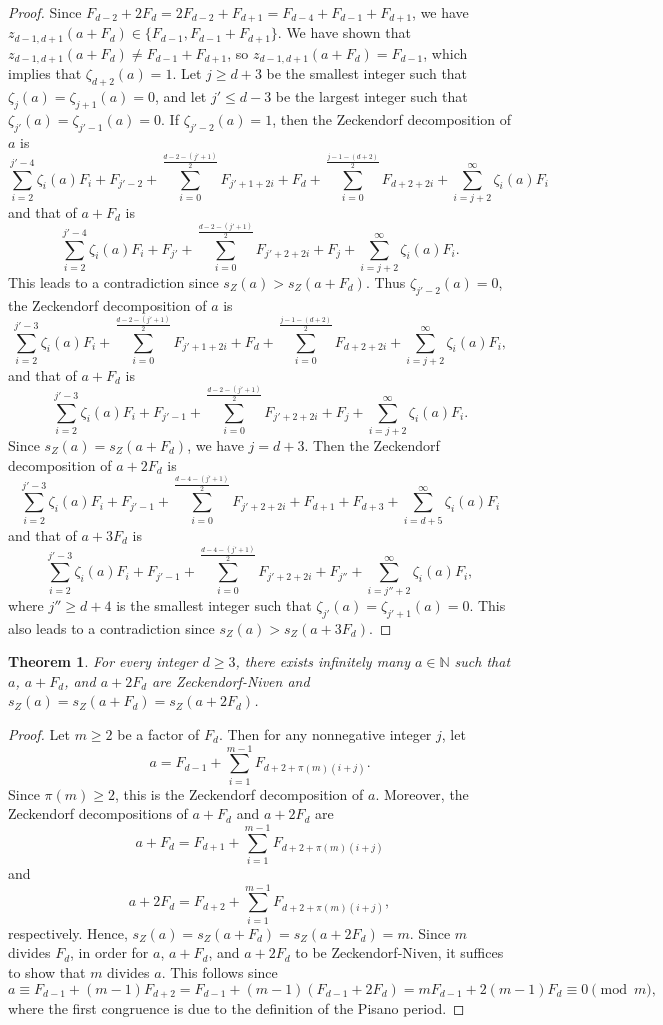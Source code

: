 \documentclass[12pt]{article}
\newtheorem{theorem}{Theorem}[section]
\theoremstyle{definition}
\newcommand{\N}{\mathbb{N}}
\begin{document}
\begin{proof}
Since $F_{d-2}+2F_d=2F_{d-2}+F_{d+1}=F_{d-4}+F_{d-1}+F_{d+1}$, we have $z_{d-1,d+1}(a+F_d)\in\{F_{d-1},F_{d-1}+F_{d+1}\}$. We have shown that $z_{d-1,d+1}(a+F_d)\neq F_{d-1}+F_{d+1}$, so $z_{d-1,d+1}(a+F_d)=F_{d-1}$, which implies that $\zeta_{d+2}(a)=1$. Let $j\geq d+3$ be the smallest integer such that $\zeta_j(a)=\zeta_{j+1}(a)=0$, and let $j'\leq d-3$ be the largest integer such that $\zeta_{j'}(a)=\zeta_{j'-1}(a)=0$. If $\zeta_{j'-2}(a)=1$, then the Zeckendorf decomposition of $a$ is
\[\sum_{i=2}^{j'-4}\zeta_i(a)F_i+F_{j'-2}+\sum_{i=0}^{\frac{d-2-(j'+1)}{2}}F_{j'+1+2i}+F_d+\sum_{i=0}^{\frac{j-1-(d+2)}{2}}F_{d+2+2i}+\sum_{i=j+2}^\infty\zeta_i(a)F_i\]
and that of $a+F_d$ is
\[\sum_{i=2}^{j'-4}\zeta_i(a)F_i+F_{j'}+\sum_{i=0}^{\frac{d-2-(j'+1)}{2}}F_{j'+2+2i}+F_j+\sum_{i=j+2}^\infty\zeta_i(a)F_i.\]
This leads to a contradiction since $s_Z(a)>s_Z(a+F_d)$. Thus $\zeta_{j'-2}(a)=0$, the Zeckendorf decomposition of $a$ is
\[\sum_{i=2}^{j'-3}\zeta_i(a)F_i+\sum_{i=0}^{\frac{d-2-(j'+1)}{2}}F_{j'+1+2i}+F_d+\sum_{i=0}^{\frac{j-1-(d+2)}{2}}F_{d+2+2i}+\sum_{i=j+2}^\infty\zeta_i(a)F_i,\]
and that of $a+F_d$ is
\[\sum_{i=2}^{j'-3}\zeta_i(a)F_i+F_{j'-1}+\sum_{i=0}^{\frac{d-2-(j'+1)}{2}}F_{j'+2+2i}+F_j+\sum_{i=j+2}^\infty\zeta_i(a)F_i.\]
Since $s_Z(a)=s_Z(a+F_d)$, we have $j=d+3$. Then the Zeckendorf decomposition of $a+2F_d$ is
\[\sum_{i=2}^{j'-3}\zeta_i(a)F_i+F_{j'-1}+\sum_{i=0}^{\frac{d-4-(j'+1)}{2}}F_{j'+2+2i}+F_{d+1}+F_{d+3}+\sum_{i=d+5}^\infty\zeta_i(a)F_i\]
and that of $a+3F_d$ is
\[\sum_{i=2}^{j'-3}\zeta_i(a)F_i+F_{j'-1}+\sum_{i=0}^{\frac{d-4-(j'+1)}{2}}F_{j'+2+2i}+F_{j''}+\sum_{i=j''+2}^\infty\zeta_i(a)F_i,\]
where $j''\geq d+4$ is the smallest integer such that $\zeta_{j'}(a)=\zeta_{j'+1}(a)=0$. This also leads to a contradiction since $s_Z(a)>s_Z(a+3F_d)$.
\end{proof}

\begin{theorem}
For every integer $d\geq3$, there exists infinitely many $a\in\N$ such that $a$, $a+F_d$, and $a+2F_d$ are Zeckendorf-Niven and $s_Z(a)=s_Z(a+F_d)=s_Z(a+2F_d)$.
\end{theorem}
\begin{proof}
Let $m\geq2$ be a factor of $F_d$. Then for any nonnegative integer $j$, let
\[a=F_{d-1}+\sum_{i=1}^{m-1}F_{d+2+\pi(m)(i+j)}.\]
Since $\pi(m)\geq2$, this is the Zeckendorf decomposition of $a$. Moreover, the Zeckendorf decompositions of $a+F_d$ and $a+2F_d$ are
\[a+F_d=F_{d+1}+\sum_{i=1}^{m-1}F_{d+2+\pi(m)(i+j)}\]
and
\[a+2F_d=F_{d+2}+\sum_{i=1}^{m-1}F_{d+2+\pi(m)(i+j)},\]
respectively. Hence, $s_Z(a)=s_Z(a+F_d)=s_Z(a+2F_d)=m$. Since $m$ divides $F_d$, in order for $a$, $a+F_d$, and $a+2F_d$ to be Zeckendorf-Niven, it suffices to show that $m$ divides $a$. This follows since
\[a\equiv F_{d-1}+(m-1)F_{d+2}=F_{d-1}+(m-1)(F_{d-1}+2F_d)=mF_{d-1}+2(m-1)F_d\equiv0\pmod{m},\]
where the first congruence is due to the definition of the Pisano period.
\end{proof}
\end{document}
